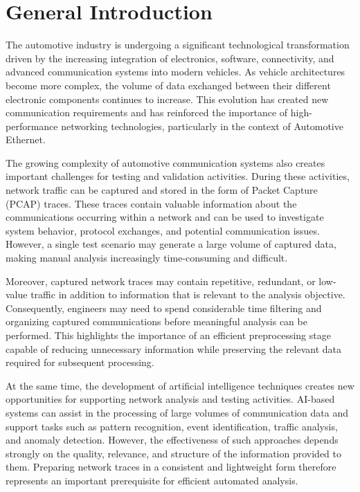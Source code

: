 \chapter*{General Introduction}

The automotive industry is undergoing a significant technological transformation driven by the increasing integration of electronics, software, connectivity, and advanced communication systems into modern vehicles. As vehicle architectures become more complex, the volume of data exchanged between their different electronic components continues to increase. This evolution has created new communication requirements and has reinforced the importance of high-performance networking technologies, particularly in the context of Automotive Ethernet.

The growing complexity of automotive communication systems also creates important challenges for testing and validation activities. During these activities, network traffic can be captured and stored in the form of Packet Capture (PCAP) traces. These traces contain valuable information about the communications occurring within a network and can be used to investigate system behavior, protocol exchanges, and potential communication issues. However, a single test scenario may generate a large volume of captured data, making manual analysis increasingly time-consuming and difficult.

Moreover, captured network traces may contain repetitive, redundant, or low-value traffic in addition to information that is relevant to the analysis objective. Consequently, engineers may need to spend considerable time filtering and organizing captured communications before meaningful analysis can be performed. This highlights the importance of an efficient preprocessing stage capable of reducing unnecessary information while preserving the relevant data required for subsequent processing.

At the same time, the development of artificial intelligence techniques creates new opportunities for supporting network analysis and testing activities. AI-based systems can assist in the processing of large volumes of communication data and support tasks such as pattern recognition, event identification, traffic analysis, and anomaly detection. However, the effectiveness of such approaches depends strongly on the quality, relevance, and structure of the information provided to them. Preparing network traces in a consistent and lightweight form therefore represents an important prerequisite for efficient automated analysis.

